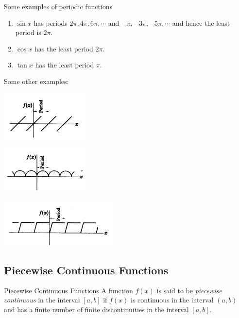 \documentclass[12pt]{article}
\begin{document}
\begin{example}{Some examples of periodic functions}{}
    \begin{enumerate}
        \item $\sin{x}$ has periods $2\pi, 4\pi, 6\pi, \cdots$ and $-\pi, -3\pi, -5\pi, \cdots$ and hence the least period is $2\pi$.\\
        \item $\cos{x}$ has the least period $2\pi$.\\
        \item $\tan{x}$ has the least period $\pi$.
    \end{enumerate}
    Some other examples:\\
    \begin{minipage}{.3\textwidth}
        \renewcommand{\thefigure}{1.1.1}
        \includegraphics[scale=0.8]{./images/1.1.1.png}
    \end{minipage}
    \begin{minipage}{.3\textwidth}
        \renewcommand{\thefigure}{1.1.2}
        \includegraphics[scale=0.8]{./images/1.1.2.png}
    \end{minipage}
    \begin{minipage}{.35\textwidth}
        \renewcommand{\thefigure}{1.1.3}
        \includegraphics[scale=0.74]{./images/1.1.3.png}
    \end{minipage}
\end{example}

\subsection{Piecewise Continuous Functions}
\begin{definition}{Piecewise Continuous Functions}{}
    A function $f(x)$ is said to be \textit{piecewise continuous} in the interval $[a,b]$ if $f(x)$ is continuous in the interval $(a,b)$ and has a finite number of finite discontinuities in the interval $[a,b]$.
\end{definition}
\end{document}
